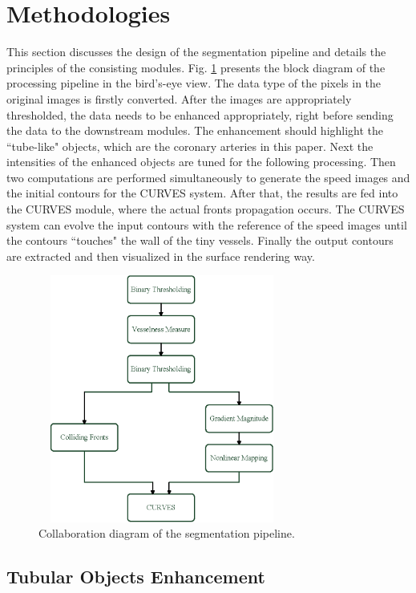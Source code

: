 
\section{Methodologies}
\label{sec4_1}

This section discusses the design of the segmentation pipeline and details the principles of the consisting modules.
Fig. \ref{fig:DataFlow4} presents the block diagram of the processing pipeline in the bird's-eye view.
The data type of the pixels in the original images is firstly converted.
After the images are appropriately thresholded, the data needs to be enhanced appropriately, right before sending the data to the downstream modules.
The enhancement should highlight the ``tube-like" objects, which are the coronary arteries in this paper.
Next the intensities of the enhanced objects are tuned for the following processing.
Then two computations are performed simultaneously to generate the speed images and the initial contours for the CURVES system.
After that, the results are fed into the CURVES module, where the actual fronts propagation occurs.
The CURVES system can evolve the input contours with the reference of the speed images until the contours ``touches" the wall of the tiny vessels.
Finally the output contours are extracted and then visualized in the surface rendering way.
\begin{figure}[t]
\centering
\includegraphics[height=3.2in,width=3.2in]{figures/chap04/DataFlow.eps}
\caption{Collaboration diagram of the segmentation pipeline.}
\label{fig:DataFlow4}
\end{figure}

\subsection{Tubular Objects Enhancement}

